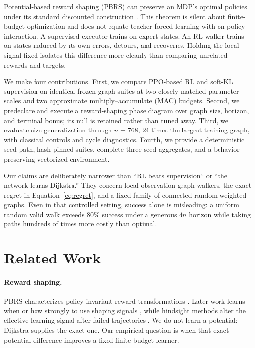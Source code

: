 \documentclass[10pt,twocolumn]{article}
\begin{document}
Potential-based reward shaping (PBRS) can preserve an MDP's optimal policies
under its standard discounted construction \citep{ng1999}.  This theorem is
silent about finite-budget optimization and does not equate teacher-forced
learning with on-policy interaction.  A supervised executor trains on expert
states.  An RL walker trains on states induced by its own errors, detours, and
recoveries.  Holding the local signal fixed isolates this difference more
cleanly than comparing unrelated rewards and targets.

We make four contributions.  First, we compare PPO-based RL and soft-KL
supervision on identical frozen graph suites at two closely matched parameter
scales and two approximate multiply--accumulate (MAC) budgets.  Second, we
predeclare and execute a reward-shaping phase diagram over graph size, horizon,
and terminal bonus; its null is retained rather than tuned away.  Third, we
evaluate size generalization through $n=768$, 24 times the largest training
graph, with classical controls and cycle diagnostics.  Fourth, we provide a
deterministic seed path, hash-pinned suites, complete three-seed aggregates,
and a behavior-preserving vectorized environment.

Our claims are deliberately narrower than ``RL beats supervision'' or
``the network learns Dijkstra.''  They concern local-observation graph walkers,
the exact regret in Equation~\eqref{eq:regret}, and a fixed family of connected random
weighted graphs.  Even in that controlled setting, success alone is
misleading: a uniform random valid walk exceeds 80\% success under a generous
$4n$ horizon while taking paths hundreds of times more costly than optimal.

\section{Related Work}

\paragraph{Reward shaping.}
PBRS characterizes policy-invariant reward transformations
\citep{ng1999}.  Later work learns when or how strongly to use shaping signals
\citep{hu2020,gupta2023}, while hindsight methods alter the effective learning
signal after failed trajectories \citep{andrychowicz2017}.  We do not learn a
potential: Dijkstra supplies the exact one.  Our empirical question is when
that exact potential difference improves a fixed finite-budget learner.
\end{document}
